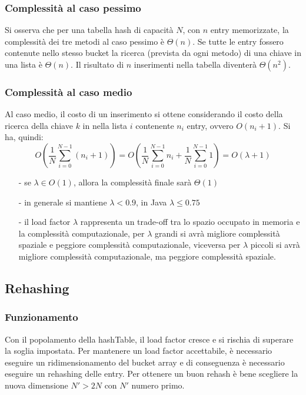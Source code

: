 \documentclass[a4paper]{article}
\begin{document}
\subsubsection*{Complessità al caso pessimo}
Si osserva che per una tabella hash di capacità \(N\), con \(n\) entry memorizzate, la complessità dei tre metodi al caso pessimo
è \(\Theta(n)\). Se tutte le entry fossero contenute nello stesso bucket la ricerca (prevista da ogni metodo) di una chiave in una
lista è \(\Theta(n)\). Il risultato di \(n\) inserimenti nella tabella diventerà \(\Theta(n^2)\).

\subsubsection*{Complessità al caso medio}
Al caso medio, il costo di un inserimento si ottene considerando il costo della ricerca della chiave \(k\) in nella lista \(i\)
contenente \(n_i\) entry, ovvero \(O(n_i + 1)\). Si ha, quindi:
\[O\left(\frac{1}{N} \sum_{i=0}^{N-1} (n_i + 1)\right) = O\left(\frac{1}{N} \sum_{i=0}^{N-1} n_i + \frac{1}{N} \sum_{i=0}^{N-1} 1\right) = O(\lambda + 1)\]
\begin{itemize}[topsep=3pt, itemsep=0pt]
	\item[-] se \(\lambda \in O(1)\), allora la complessità finale sarà \(\Theta(1)\)
	\item[-] in generale si mantiene \(\lambda < 0.9\), in Java \(\lambda \leq 0.75\)
	\item[-] il load factor \(\lambda\) rappresenta un trade-off tra lo spazio occupato in memoria e la complessità computazionale,
	per \(\lambda\) grandi si avrà migliore complessità spaziale e peggiore complessità computazionale, viceversa per \(\lambda\)
	piccoli si avrà migliore complessità computazionale, ma peggiore complessità spaziale.
\end{itemize}

\subsection{Rehashing}
\subsubsection*{Funzionamento}
Con il popolamento della hashTable, il load factor cresce e si rischia di superare la soglia impostata. Per mantenere un load
factor accettabile, è necessario eseguire un ridimensionamento del bucket array e di conseguenza è necessario eseguire un rehashing
delle entry. Per ottenere un buon rehash è bene scegliere la nuova dimensione \(N' > 2N\) con \(N'\) numero primo.
\end{document}
